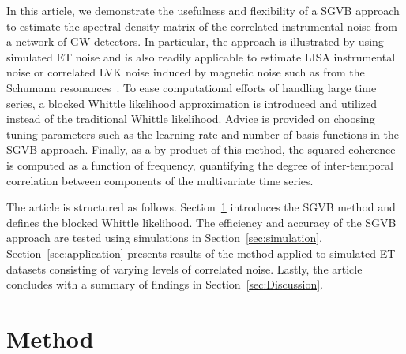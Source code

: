 \documentclass[%
 reprint,
 amsmath,amssymb,
 aps,
 nofootinbib,
]{revtex4-2}
\begin{document}

In this article, we demonstrate the usefulness and flexibility of a SGVB approach to estimate the spectral density matrix of the correlated instrumental noise from a  network of \ac{GW} detectors.
In particular, the approach is illustrated by using simulated ET noise and is also readily applicable to estimate  \ac{LISA} instrumental noise or correlated \ac{LVK} noise induced by magnetic noise such as from the Schumann resonances~\cite{Thrane_correlations_SGWB}.
To ease computational efforts of handling large time series, a blocked Whittle likelihood approximation is introduced and utilized instead of the traditional Whittle likelihood. 
Advice is provided on choosing tuning parameters such as the learning rate and number of basis functions in the SGVB approach. 
Finally, as a by-product of this method, the squared coherence is computed  as a function of frequency, quantifying the degree of inter-temporal correlation between components of the multivariate time series. 

The article is structured as follows.
Section~\ref{sec:method} introduces the \ac{SGVB} method and defines the blocked Whittle likelihood.
The efficiency and accuracy of the SGVB approach are tested using simulations in Section~\ref{sec:simulation}. 
Section~\ref{sec:application} presents results of the method applied to simulated \ac{ET} datasets consisting of varying levels of correlated noise. 
Lastly, the article concludes with a summary of findings in Section~\ref{sec:Discussion}.

\section{Method}
\label{sec:method}
\end{document}
